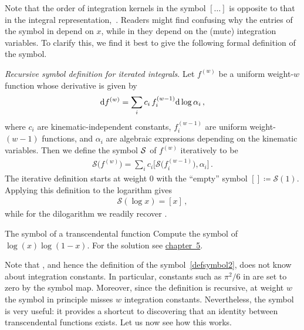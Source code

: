  Note that the order of integration kernels in the symbol $[\ldots ]$ is opposite to that in the integral representation,~.
 Readers might find confusing why the entries of the symbol in  depend on $x$, while in  they depend on the (mute) integration variables. To clarify this, we find it best to give the following formal definition of the symbol.
 
 \smallskip
 
 {\it Recursive symbol definition for iterated integrals}. Let $f^{(w)}$ be a uniform 
  weight-$w$ function whose derivative is given by 
 \begin{align}\label{defsymbol1}
\mathrm{d} f^{(w)} = \sum_i c_i \, f_{i}^{(w-1)} \mathrm{d}\log \alpha_i\,,
\end{align}
where $c_{i}$ are kinematic-independent constants, $f_{i}^{(w-1)}$ are uniform weight-$(w-1)$ functions, and $\alpha_i$ are algebraic expressions depending on the kinematic variables.
 Then we define the symbol ${\cal S}$ of $f^{(w)}$ iteratively to be 
\begin{align}\label{defsymbol2}
\mathcal{S}\bigl(f^{(w)}\bigr) = \sum_i c_i  \bigl[ \mathcal{S}\bigl(f_{i}^{(w-1)} \bigr) , \alpha_i \bigr] \,.
 \end{align}
The iterative definition starts at weight $0$ with the ``empty'' symbol $[] \coloneqq \mathcal{S}(1)$. Applying this definition to the logarithm gives
\begin{align} \label{eq:symbol_log}
\mathcal{S}(\log x ) = [x] \,,
\end{align}
while for the dilogarithm we readily recover .

\begin{exer}{The symbol of a transcendental function}
\label{Ex:4.Symbol}
Compute the symbol of $\log(x) \log (1-x)$.
For the solution see \hyperref[Sol:4.Symbol]{chapter~5}.
\end{exer}

Note that , and hence the definition of the symbol~\eqref{defsymbol2}, does not know about integration constants. 
In particular, constants such as $\pi^2/6$ in  are set to zero by the symbol map.
Moreover, since the definition is recursive, at weight $w$ the symbol in principle misses $w$ integration constants.
Nevertheless, the symbol is very useful: it provides a shortcut to discovering that an identity between transcendental functions exists. 
Let us now see how this works.

